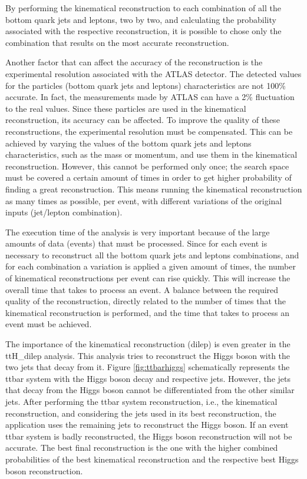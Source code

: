 By performing the kinematical reconstruction to each combination of all the bottom quark jets and leptons, two by two, and calculating the probability associated with the respective reconstruction, it is possible to chose only the combination that results on the most accurate reconstruction.

Another factor that can affect the accuracy of the reconstruction is the experimental resolution associated with the ATLAS detector. The detected values for the particles (bottom quark jets and leptons) characteristics are not 100\% accurate. In fact, the measurements made by ATLAS can have a 2\% fluctuation to the real values. Since these particles are used in the kinematical reconstruction, its accuracy can be affected. To improve the quality of these reconstructions, the experimental resolution must be compensated. This can be achieved by varying the values of the bottom quark jets and leptons characteristics, such as the mass or momentum, and use them in the kinematical reconstruction. However, this cannot be performed only once; the search space must be covered a certain amount of times in order to get higher probability of finding a great reconstruction. This means running the kinematical reconstruction as many times as possible, per event, with different variations of the original inputs (jet/lepton combination).

The execution time of the analysis is very important because of the large amounts of data (events) that must be processed. Since for each event is necessary to reconstruct all the bottom quark jets and leptons combinations, and for each combination a variation is applied a given amount of times, the number of kinematical reconstructions per event can rise quickly. This will increase the overall time that takes to process an event. A balance between the required quality of the reconstruction, directly related to the number of times that the kinematical reconstruction is performed, and the time that takes to process an event must be achieved. 

The importance of the kinematical reconstruction (dilep) is even greater in the ttH\_dilep analysis. This analysis tries to reconstruct the Higgs boson with the two jets that decay from it. Figure \ref{fig:ttbarhiggs} schematically represents the ttbar system with the Higgs boson decay and respective jets. However, the jets that decay from the Higgs boson cannot be differentiated from the other similar jets. After performing the ttbar system reconstruction, i.e., the kinematical reconstruction, and considering the jets used in its best reconstruction, the application uses the remaining jets to reconstruct the Higgs boson. If an event ttbar system is badly reconstructed, the Higgs boson reconstruction will not be accurate. The best final reconstruction is the one with the higher combined probabilities of the best kinematical reconstruction and the respective best Higgs boson reconstruction. 

